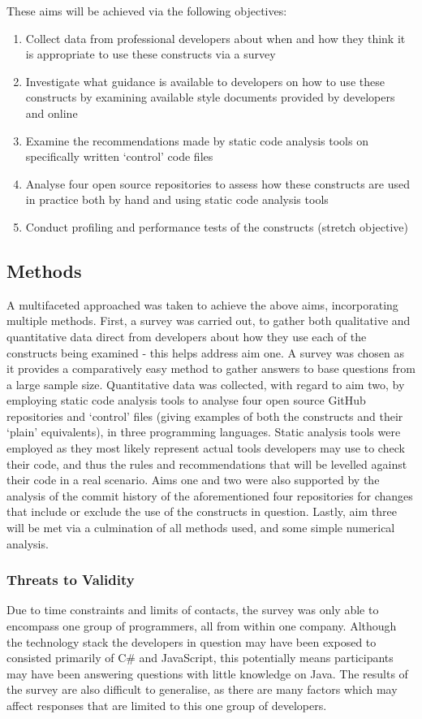 \documentclass{article}
\begin{document}
        These aims will be achieved via the following objectives:
        \begin{enumerate}
            \item Collect data from professional developers about when and how they think it is appropriate to use these constructs via a survey
            \item Investigate what guidance is available to developers on how to use these constructs by examining available style documents provided by developers and online
            \item Examine the recommendations made by static code analysis tools on specifically written `control' code files
            \item Analyse four open source repositories to assess how these constructs are used in practice both by hand and using static code analysis tools
            \item Conduct profiling and performance tests of the constructs (stretch objective)
        \end{enumerate}

    \subsection{Methods}
        A multifaceted approached was taken to achieve the above aims, incorporating multiple methods. First, a survey was carried out, to gather both qualitative and quantitative data direct from developers about how they use each of the constructs being examined - this helps address aim one. A survey was chosen as it provides a comparatively easy method to gather answers to base questions from a large sample size.
        Quantitative data was collected, with regard to aim two, by employing static code analysis tools to analyse four open source GitHub repositories and `control' files (giving examples of both the constructs and their `plain' equivalents), in three programming languages. Static analysis tools were employed as they most likely represent actual tools developers may use to check their code, and thus the rules and recommendations that will be levelled against their code in a real scenario.
        Aims one and two were also supported by the analysis of the commit history of the aforementioned four repositories for changes that include or exclude the use of the constructs in question. Lastly, aim three will be met via a culmination of all methods used, and some simple numerical analysis.

        \subsubsection{Threats to Validity}
            Due to time constraints and limits of contacts, the survey was only able to encompass one group of programmers, all from within one company. Although the technology stack the developers in question may have been exposed to consisted primarily of C\# and JavaScript, this potentially means participants may have been answering questions with little knowledge on Java. The results of the survey are also difficult to generalise, as there are many factors which may affect responses that are limited to this one group of developers.
\end{document}
